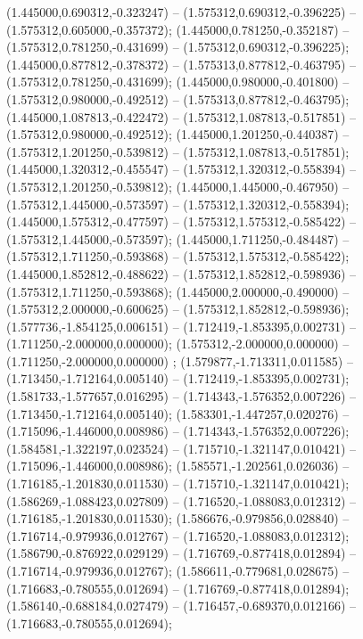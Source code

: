  (1.445000,0.690312,-0.323247) -- (1.575312,0.690312,-0.396225) -- (1.575312,0.605000,-0.357372);
 (1.445000,0.781250,-0.352187) -- (1.575312,0.781250,-0.431699) -- (1.575312,0.690312,-0.396225);
 (1.445000,0.877812,-0.378372) -- (1.575313,0.877812,-0.463795) -- (1.575312,0.781250,-0.431699);
 (1.445000,0.980000,-0.401800) -- (1.575312,0.980000,-0.492512) -- (1.575313,0.877812,-0.463795);
 (1.445000,1.087813,-0.422472) -- (1.575312,1.087813,-0.517851) -- (1.575312,0.980000,-0.492512);
 (1.445000,1.201250,-0.440387) -- (1.575312,1.201250,-0.539812) -- (1.575312,1.087813,-0.517851);
 (1.445000,1.320312,-0.455547) -- (1.575312,1.320312,-0.558394) -- (1.575312,1.201250,-0.539812);
 (1.445000,1.445000,-0.467950) -- (1.575312,1.445000,-0.573597) -- (1.575312,1.320312,-0.558394);
 (1.445000,1.575312,-0.477597) -- (1.575312,1.575312,-0.585422) -- (1.575312,1.445000,-0.573597);
 (1.445000,1.711250,-0.484487) -- (1.575312,1.711250,-0.593868) -- (1.575312,1.575312,-0.585422);
 (1.445000,1.852812,-0.488622) -- (1.575312,1.852812,-0.598936) -- (1.575312,1.711250,-0.593868);
 (1.445000,2.000000,-0.490000) -- (1.575312,2.000000,-0.600625) -- (1.575312,1.852812,-0.598936);
 (1.577736,-1.854125,0.006151) -- (1.712419,-1.853395,0.002731) -- (1.711250,-2.000000,0.000000);
 (1.575312,-2.000000,0.000000) -- (1.711250,-2.000000,0.000000) ;
 (1.579877,-1.713311,0.011585) -- (1.713450,-1.712164,0.005140) -- (1.712419,-1.853395,0.002731);
 (1.581733,-1.577657,0.016295) -- (1.714343,-1.576352,0.007226) -- (1.713450,-1.712164,0.005140);
 (1.583301,-1.447257,0.020276) -- (1.715096,-1.446000,0.008986) -- (1.714343,-1.576352,0.007226);
 (1.584581,-1.322197,0.023524) -- (1.715710,-1.321147,0.010421) -- (1.715096,-1.446000,0.008986);
 (1.585571,-1.202561,0.026036) -- (1.716185,-1.201830,0.011530) -- (1.715710,-1.321147,0.010421);
 (1.586269,-1.088423,0.027809) -- (1.716520,-1.088083,0.012312) -- (1.716185,-1.201830,0.011530);
 (1.586676,-0.979856,0.028840) -- (1.716714,-0.979936,0.012767) -- (1.716520,-1.088083,0.012312);
 (1.586790,-0.876922,0.029129) -- (1.716769,-0.877418,0.012894) -- (1.716714,-0.979936,0.012767);
 (1.586611,-0.779681,0.028675) -- (1.716683,-0.780555,0.012694) -- (1.716769,-0.877418,0.012894);
 (1.586140,-0.688184,0.027479) -- (1.716457,-0.689370,0.012166) -- (1.716683,-0.780555,0.012694);
